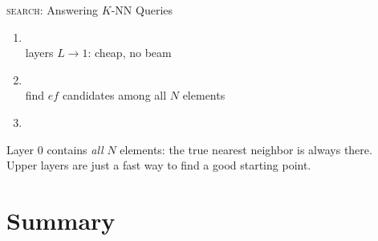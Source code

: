 \documentclass[aspectratio=169,10pt]{beamer}
\newcommand{\ef}{\mathit{ef}}
\begin{document}
\begin{frame}{\textsc{search}: Answering $K$-NN Queries}

\begin{enumerate}
  \item {}\\
    {\small layers $L \to 1$: cheap, no beam}

  \bigskip
  \item {}\\
    {\small find $\ef$ candidates among all $N$ elements}

  \bigskip
  \item {}
\end{enumerate}

\bigskip
\begin{insightbox}
  Layer 0 contains \emph{all} $N$ elements: the true nearest neighbor is always there.\\
  Upper layers are just a fast way to find a good starting point.
\end{insightbox}

\end{frame}


\section{Summary}
\sectionframe
\end{document}
